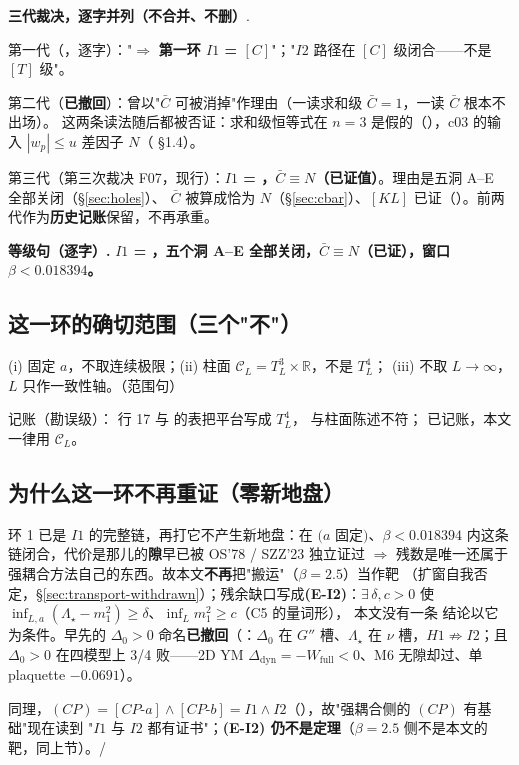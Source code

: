 \begin{keybox}
\textbf{三代裁决，逐字并列（不合并、不删）}.\par\smallskip
第一代（，逐字）："$\Rightarrow$ \textbf{第一环 $I1$ = $[C]$}"；"$I2$ 路径在 $[C]$ 级闭合——不是 $[T]$ 级"。
\par\smallskip
第二代（\textbf{已撤回}）：曾以"$\bar C$ 可被消掉"作理由（一读求和级 $\bar C=1$，一读 $\bar C$ 根本不出场）。
这两条读法随后都被否证：求和级恒等式在 $n=3$ 是假的（），c03 的输入 $|w_p|\le u$ 差因子 $N$（ \S1.4）。
\par\smallskip
第三代（第三次裁决 F07，现行）：\textbf{$I1$ = \LT{}，$\bar C\equiv N$（已证值）}。理由是五洞 A--E 全部关闭（\S\ref{sec:holes}）、
$\bar C$ 被算成恰为 $N$（\S\ref{sec:cbar}）、$[KL]$ 已证（）。前两代作为\textbf{历史记账}保留，不再承重。
\par\smallskip
\textbf{等级句（逐字）.} \textbf{$I1$ = \LT{}，五个洞 A--E 全部关闭，$\bar C\equiv N$（已证），窗口 $\beta<0.018394$。}
\end{keybox}

\subsection{这一环的确切范围（三个"不"）}

(i) 固定 $a$，不取连续极限；(ii) 柱面 $\mathcal{C}_L=T^3_L\times\mathbb{R}$，不是 $T^4_L$；
(iii) 不取 $L\to\infty$，$L$ 只作一致性轴。\LT{}（范围句）

\LM{} 记账（勘误级）： 行 17 与  的表把平台写成 $T^4_L$，
与柱面陈述不符； 已记账，本文一律用 $\mathcal{C}_L$。

\subsection{为什么这一环不再重证（零新地盘）}

环 1 已是 $I1$ 的完整链，再打它不产生新地盘：在 $(a$ 固定$)$、$\beta<0.018394$ 内这条链闭合，代价是那儿的\textbf{隙}早已被
OS'78 / SZZ'23 独立证过 $\Rightarrow$ 残数是唯一还属于强耦合方法自己的东西。故本文\textbf{不再}把"搬运"（$\beta=2.5$）当作靶
（扩窗自我否定，\S\ref{sec:transport-withdrawn}）；残余缺口写成\textbf{(E-I2)}：$\exists\,\delta,c>0$ 使 $\inf_{L,a}(\Lambda_\star-m_1^2)\ge\delta$、$\inf_L m_1^2\ge c$（C5 的量词形），
本文没有一条 \LT{} 结论以它为条件。早先的 $\Delta_0>0$ 命名\textbf{已撤回}（：$\Delta_0$ 在 $G''$ 槽、$\Lambda_\star$ 在 $\nu$ 槽，$H1\not\Rightarrow I2$；且 $\Delta_0>0$ 在四模型上 3/4 败——2D YM $\Delta_{\mathrm{dyn}}=-W_{\mathrm{full}}<0$、M6 无隙却过、单 plaquette $-0.0691$）。\LM
{}

同理，$(CP)=[CP\text{-}a]\wedge[CP\text{-}b]=I1\wedge I2$（），故"强耦合侧的 $(CP)$ 有基础"现在读到
"$I1$ 与 $I2$ 都有证书"；\textbf{(E-I2) 仍不是定理}（$\beta=2.5$ 侧不是本文的靶，同上节）。\LT/\LC
{}
